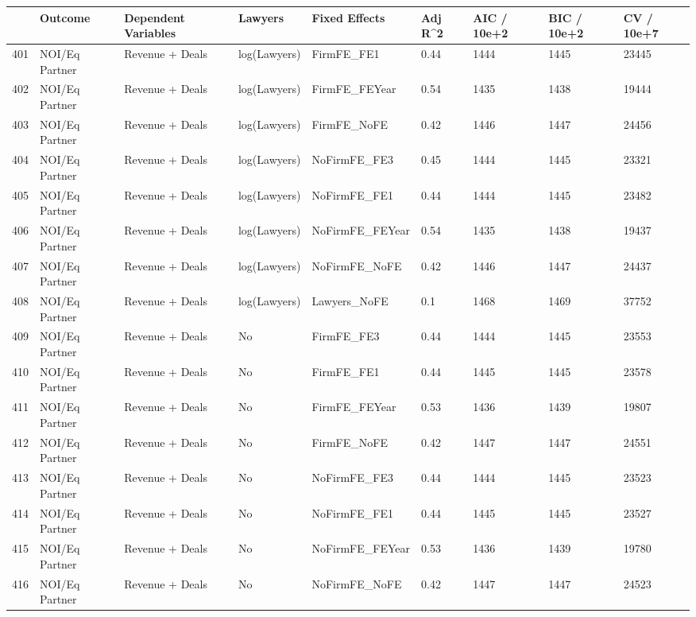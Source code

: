 \documentclass{article}
\begin{document}
\begin{table}[H]
\centering
\begin{tabular}{rllllllll}
  \hline
 & Outcome & Dependent Variables & Lawyers & Fixed Effects & Adj R^2 & AIC / 10e+2 & BIC / 10e+2 & CV / 10e+7 \\ 
  \hline
401 & NOI/Eq Partner & Revenue + Deals & log(Lawyers) & FirmFE\_FE1 & 0.44 & 1444 & 1445 & 23445 \\ 
  402 & NOI/Eq Partner & Revenue + Deals & log(Lawyers) & FirmFE\_FEYear & 0.54 & 1435 & 1438 & 19444 \\ 
  403 & NOI/Eq Partner & Revenue + Deals & log(Lawyers) & FirmFE\_NoFE & 0.42 & 1446 & 1447 & 24456 \\ 
  404 & NOI/Eq Partner & Revenue + Deals & log(Lawyers) & NoFirmFE\_FE3 & 0.45 & 1444 & 1445 & 23321 \\ 
  405 & NOI/Eq Partner & Revenue + Deals & log(Lawyers) & NoFirmFE\_FE1 & 0.44 & 1444 & 1445 & 23482 \\ 
  406 & NOI/Eq Partner & Revenue + Deals & log(Lawyers) & NoFirmFE\_FEYear & 0.54 & 1435 & 1438 & 19437 \\ 
  407 & NOI/Eq Partner & Revenue + Deals & log(Lawyers) & NoFirmFE\_NoFE & 0.42 & 1446 & 1447 & 24437 \\ 
  408 & NOI/Eq Partner & Revenue + Deals & log(Lawyers) & Lawyers\_NoFE & 0.1 & 1468 & 1469 & 37752 \\ 
  409 & NOI/Eq Partner & Revenue + Deals & No & FirmFE\_FE3 & 0.44 & 1444 & 1445 & 23553 \\ 
  410 & NOI/Eq Partner & Revenue + Deals & No & FirmFE\_FE1 & 0.44 & 1445 & 1445 & 23578 \\ 
  411 & NOI/Eq Partner & Revenue + Deals & No & FirmFE\_FEYear & 0.53 & 1436 & 1439 & 19807 \\ 
  412 & NOI/Eq Partner & Revenue + Deals & No & FirmFE\_NoFE & 0.42 & 1447 & 1447 & 24551 \\ 
  413 & NOI/Eq Partner & Revenue + Deals & No & NoFirmFE\_FE3 & 0.44 & 1444 & 1445 & 23523 \\ 
  414 & NOI/Eq Partner & Revenue + Deals & No & NoFirmFE\_FE1 & 0.44 & 1445 & 1445 & 23527 \\ 
  415 & NOI/Eq Partner & Revenue + Deals & No & NoFirmFE\_FEYear & 0.53 & 1436 & 1439 & 19780 \\ 
  416 & NOI/Eq Partner & Revenue + Deals & No & NoFirmFE\_NoFE & 0.42 & 1447 & 1447 & 24523 \\ 

\end{tabular}
\end{table}
\end{document}
